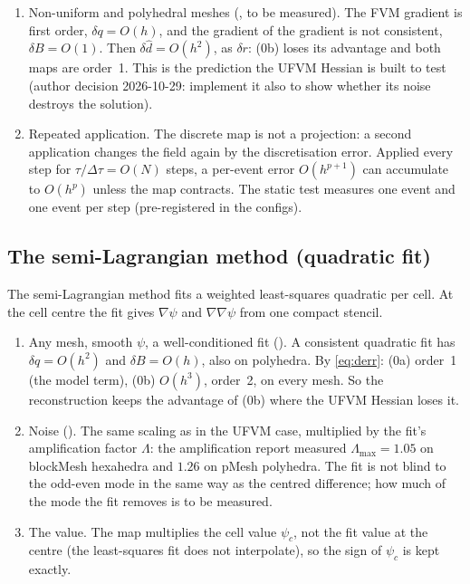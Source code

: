 \begin{enumerate}
therefore integrate with Euler (\texttt{PSI\_DDT\_SCHEME}).
\item Non-uniform and polyhedral meshes (\Der, to be measured). The FVM gradient is first order,
$\delta q=O(h)$, and the gradient of the gradient is not consistent, $\delta B=O(1)$. Then
$\delta\hat d=O(h^2)$, as $\delta r$: (0b) loses its advantage and both maps are order~1. This
is the prediction the UFVM Hessian is built to test (author decision 2026-10-29: implement it
also to show whether its noise destroys the solution).
\item Repeated application. The discrete map is not a projection: a second application changes
the field again by the discretisation error. Applied every step for $\tau/\Delta\tau=O(N)$
steps, a per-event error $O(h^{p+1})$ can accumulate to $O(h^p)$ unless the map contracts. The
static test measures one event and one event per step (pre-registered in the configs).
\end{enumerate}

\subsection{The semi-Lagrangian method (quadratic fit)}
\label{sec:rescaling-sl}

The semi-Lagrangian method fits a weighted least-squares quadratic per cell. At the cell centre
the fit gives $\nabla\psi$ and $\nabla\nabla\psi$ from one compact stencil.

\begin{enumerate}
\item Any mesh, smooth $\psi$, a well-conditioned fit (\Der). A consistent quadratic fit has
$\delta q=O(h^2)$ and $\delta B=O(h)$, also on polyhedra. By \eqref{eq:derr}: (0a) order~1 (the
model term), (0b) $O(h^3)$, order~2, on every mesh. So the reconstruction keeps the advantage of
(0b) where the UFVM Hessian loses it.
\item Noise (\Der). The same scaling as in the UFVM case, multiplied by the fit's amplification
factor $\Lambda$: the amplification report measured $\Lambda_{\max}=1.05$ on blockMesh
hexahedra and $1.26$ on pMesh polyhedra. The fit is not blind to the odd-even mode in the same
way as the centred difference; how much of the mode the fit removes is to be measured.
\item The value. The map multiplies the cell value $\psi_c$, not the fit value at the centre
(the least-squares fit does not interpolate), so the sign of $\psi_c$ is kept exactly.
\end{enumerate}
